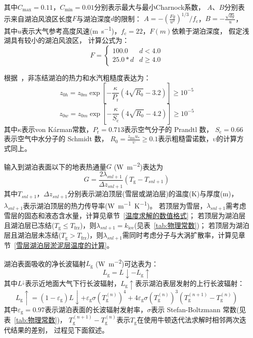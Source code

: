 其中$C_{\mathrm{max}}=0.11$，$C_{\mathrm{min}}=0.01$分别表示最大与最小Charnock系数，
$A$、$B$分别表示来自湖泊风浪区长度$F$与湖泊深度$d$的限制：
$A=-\left(\frac{Fg}{u^2}\right)^{1/3}/f_{\mathrm {c}} $，$B=-\frac{\sqrt{dg}}{u}$，
其中$u$表示大气参考高度风速(\unit{m.s^{-1}})，$f_{\mathrm {c}} =22$，$F(m)$依赖于湖泊深度，
假定浅湖具有较小的湖泊风浪区，
计算公式为：$$F=\left\{\begin{array}{ll}100.0 & d<4.0 \\ 25.0 * d & d \geqslant 4.0\end{array}\right.$$


根据~\citet{Zilitinkevich2001}，非冻结湖泊的热力和水汽粗糙度表达为：
\begin{equation}
  z_{0 h}=z_{0 m} \exp \left[-\frac{\kappa}{P_{\mathrm{r}}}\left(4 \sqrt{R_{0}}-3.2\right)\right] \geqslant 10^{-5}
\end{equation}
\begin{equation}
  z_{0 w}=z_{0 m} \exp \left[-\frac{\kappa}{S_{\mathrm{c}}}\left(4 \sqrt{R_{0}}-4.2\right)\right] \geqslant 10^{-5}
\end{equation}
其中$\kappa$表示von K\'arman常数，$P_{\mathrm {r}} =0.713$表示空气分子的 Prandtl 数，
$S_{\mathrm {c}} =0.66$表示空气中水分子的 Schmidt 数，
$R_0=\frac{z_{0m}u_\ast}{\upsilon}\geqslant0.1$表示粗糙雷诺数，$\upsilon$的计算方式同上。


输入到湖泊表面以下的地表热通量$G$ (\unit{W.m^{-2}})表达为
\begin{equation}
  G=\frac{2 \lambda_{snl+1}}{\Delta z_{snl+1}}\left(T_{\mathrm{g}}-T_{snl+1}\right)
\end{equation}
其中$T_{snl+1}$，$\Delta z_{snl+1}$分别表示湖泊顶层(雪层或湖泊层)的温度(K)与厚度(m)，
$\lambda_{snl+1}$表示湖泊顶层的热力传导率(\unit{W.m^{-1}.K^{-1}})。
若顶层为雪层，$\lambda_{snl+1}$需考虑雪层的固态和液态含水量，计算见章节~\ref{温度求解的数值格式}；
若顶层为湖泊层且湖泊层已冻结($T_{\mathrm {g}} \leqslant T_{\mathrm {frz}} $)，则$\lambda_{snl+1}=k_{\mathrm {ice}}$(见表~\ref{tab:物理常数})；
若顶层为湖泊层且湖泊层未冻结($T_{\mathrm {g}} >T_{\mathrm {frz}} $)，则$\lambda_{snl+1}$需同时考虑分子与大涡扩散率，计算见章节~\ref{雪层湖泊层淤泥层温度的计算}。


湖泊表面吸收的净长波辐射$L_{\mathrm {g}} $ (\unit{W.m^{-2}})可达表为：
\begin{equation}
  L_{\mathrm{g}}=L \downarrow-L_{\mathrm{g}} \uparrow
\end{equation}
其中$L^\downarrow$表示近地面大气下行长波辐射，$L_{\mathrm {g}} \uparrow$表示湖泊表层发射的上行长波辐射：
\begin{equation}
  L_{\mathrm{g}} \uparrow=\left(1-\varepsilon_{\mathrm{g}}\right) L \downarrow+\varepsilon_{\mathrm{g}}
  \sigma\left(T_{\mathrm{g}}^{(n)}\right)^{4}+4 \varepsilon_{\mathrm{g}}
  \sigma\left(T_{\mathrm{g}}^{(n)}\right)^{3}\left(T_{\mathrm{g}}^{(n+1)}-T_{\mathrm{g}}^{(n)}\right)
\end{equation}
其中$\varepsilon_{\mathrm {g}} =0.97$表示湖泊表面的长波辐射发射率，$\sigma$表示 Stefan-Boltzmann 常数(见表~\ref{tab:物理常数})，
$T_{\mathrm {g}} ^{\left(n+1\right)}-T_{\mathrm {g}} ^{\left(n\right)}$表示$T_{\mathrm {g}} $在使用牛顿迭代法求解时相邻两次迭代结果的差别，
过程见下面叙述。


